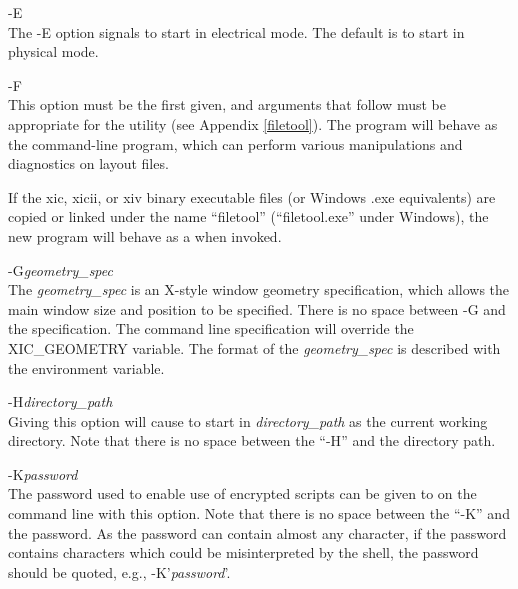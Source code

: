 \begin{description}
\item{\et -E}\\
The {\et -E} option signals {\Xic} to start in electrical mode.  The
default is to start in physical mode.

\item{\et -F}\\
This option must be the first given, and arguments that follow must be
appropriate for the {\FileTool} utility (see Appendix \ref{filetool}). 
The program will behave as the command-line {\FileTool} program, which
can perform various manipulations and diagnostics on layout files.

If the {\vt xic}, {\vt xicii}, or {\vt xiv} binary executable files
(or Windows {\vt .exe} equivalents) are copied or linked under the
name ``{\vt filetool}'' (``{\vt filetool.exe}'' under Windows), the
new program will behave as a {\FileTool} when invoked.

\item{\et -G}{\it geometry\_spec}\\
The {\it geometry\_spec} is an X-style window geometry specification,
which allows the main window size and position to be specified.  There
is no space between {\vt -G} and the specification.  The command line
specification will override the {\et XIC\_GEOMETRY} variable.  The
format of the {\it geometry\_spec} is described with the environment
variable.

\item{\et -H}{\it directory\_path}\\
Giving this option will cause {\Xic} to start in {\it directory\_path}
as the current working directory.  Note that there is no space between
the ``{\vt -H}'' and the directory path.

\item{\et -K}{\it password}\\
The password used to enable use of encrypted scripts can be given to
{\Xic} on the command line with this option.  Note that there is no
space between the ``{\vt -K}'' and the password.  As the password can
contain almost any character, if the password contains characters
which could be misinterpreted by the shell, the password should be
quoted, e.g., {\vt -K'}{\it password\/}{\vt '}.


\end{description}
